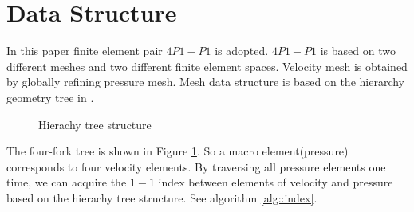 \documentclass[a4paper, 11pt]{article}
\begin{document}
\section{Data Structure}
   In this paper finite element pair $4P1-P1$ is adopted. $4P1-P1$ is
   based on two different meshes and two different finite element
   spaces. Velocity mesh is obtained by globally refining pressure
   mesh. Mesh data structure is based on the hierarchy geometry tree
   in \cite{li2005multi}.
   \begin{figure}[h]
     \caption{Hierachy tree structure}
     \label{fig::hgrometrytree}
   \end{figure}
   The four-fork tree is shown in Figure \ref{fig::hgrometrytree}.
   So a macro element(pressure) corresponds to four velocity elements. 
   By traversing all pressure elements one time, we can acquire the $1-1$
   index between elements of velocity and pressure based on the
   hierachy tree structure. See algorithm
   \ref{alg::index}.  
\end{document}
